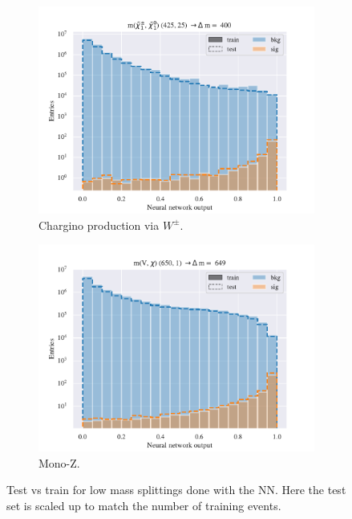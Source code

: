 \begin{figure}[H]
    \begin{subfigure}[t!]{0.49\textwidth}
        \includegraphics[width = \textwidth]{Figures/WW/NN/All_level/High/scaled_train_test_395330.pdf}
        \caption{Chargino production via $W^\pm$.}
        \label{fig:WWNNLow}
    \end{subfigure}
    \begin{subfigure}[t!]{0.49\textwidth}
        \includegraphics[width = \textwidth]{Figures/Mono_Z/ML/NN/All_level/High/scaled_train_test_310617.pdf}
        \caption{Mono-Z.}
        \label{fig:MonoZNNLow}
    \end{subfigure}
    \caption{Test vs train for low mass splittings done with the NN. Here the test set is scaled up to match the number of training events.}
    \label{fig:AllLowNN}
\end{figure}






